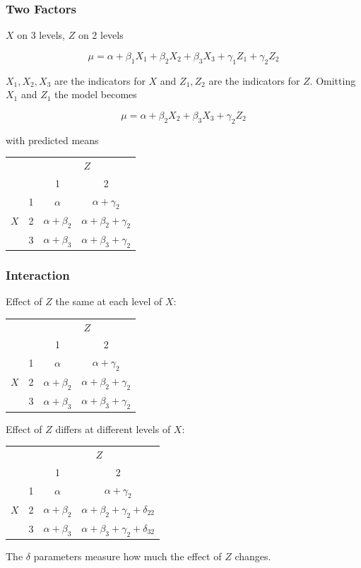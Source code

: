 \documentclass[xcolor={table}]{beamer}
\begin{document}
\begin{frame}[shrink=2]\frametitle{Two Factors}
$X$ on 3 levels, $Z$ on 2 levels

$$\mu=\alpha+\beta_1X_1+\beta_2X_2+\beta_3X_3+\gamma_1Z_1+\gamma_2Z_2$$ 

$X_1,X_2,X_3$ are the indicators for $X$ and $Z_1,Z_2$ are the indicators for $Z$. Omitting $X_1$ and $Z_1$ the model becomes

$$\mu=\alpha+\beta_2X_2+\beta_3X_3+\gamma_2Z_2$$ 

with predicted means

\begin{center}
\begin{tabular}{c c c c}
&&\multicolumn{2}{c}{$Z$}\\
&&1&2\\
\hline
   &1&$\alpha$&$\alpha+\gamma_2$\\
$X$&2&$\alpha+\beta_2$&$\alpha+\beta_2+\gamma_2$\\
   &3&$\alpha+\beta_3$&$\alpha+\beta_3+\gamma_2$\\
\end{tabular}
\end{center}
\end{frame}


\begin{frame}[shrink=2]\frametitle{Interaction}
Effect of $Z$ the same at each level of $X$:

\begin{center}
\begin{tabular}{c c c c}
&&\multicolumn{2}{c}{$Z$}\\
&&1&2\\
\hline
   &1&$\alpha$&$\alpha+\gamma_2$\\
$X$&2&$\alpha+\beta_2$&$\alpha+\beta_2+\gamma_2$\\
   &3&$\alpha+\beta_3$&$\alpha+\beta_3+\gamma_2$\\
\end{tabular}
\end{center}

Effect of $Z$ differs at different levels of $X$:

\begin{center}
\begin{tabular}{c c c c}
&&\multicolumn{2}{c}{$Z$}\\
&&1&2\\
\hline
   &1&$\alpha$&$\alpha+\gamma_2$\\
$X$&2&$\alpha+\beta_2$&$\alpha+\beta_2+\gamma_2+\delta_{22}$\\
   &3&$\alpha+\beta_3$&$\alpha+\beta_3+\gamma_2+\delta_{32}$\\
\end{tabular}
\end{center}

The $\delta$ parameters measure how much the effect of $Z$ changes.
\end{frame}
\end{document}

